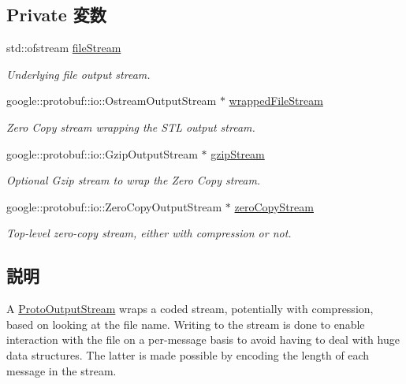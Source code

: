 \subsection*{Private 変数}
\begin{DoxyCompactItemize}
\item 
std::ofstream \hyperlink{classProtoOutputStream_a028bd7a7284a793accbd103bba2eaa23}{fileStream}
\begin{DoxyCompactList}\small\item\em Underlying file output stream. \item\end{DoxyCompactList}\item 
google::protobuf::io::OstreamOutputStream $\ast$ \hyperlink{classProtoOutputStream_ac29615f2f31f335197bcebbc248807aa}{wrappedFileStream}
\begin{DoxyCompactList}\small\item\em Zero Copy stream wrapping the STL output stream. \item\end{DoxyCompactList}\item 
google::protobuf::io::GzipOutputStream $\ast$ \hyperlink{classProtoOutputStream_a98a9278e366c43618c04c25c77e73c4e}{gzipStream}
\begin{DoxyCompactList}\small\item\em Optional Gzip stream to wrap the Zero Copy stream. \item\end{DoxyCompactList}\item 
google::protobuf::io::ZeroCopyOutputStream $\ast$ \hyperlink{classProtoOutputStream_a9d032f60609c0513069efc5003f21840}{zeroCopyStream}
\begin{DoxyCompactList}\small\item\em Top-\/level zero-\/copy stream, either with compression or not. \item\end{DoxyCompactList}\end{DoxyCompactItemize}


\subsection{説明}
A \hyperlink{classProtoOutputStream}{ProtoOutputStream} wraps a coded stream, potentially with compression, based on looking at the file name. Writing to the stream is done to enable interaction with the file on a per-\/message basis to avoid having to deal with huge data structures. The latter is made possible by encoding the length of each message in the stream. 

